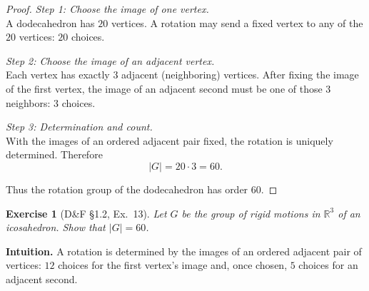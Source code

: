 \documentclass[12pt]{article}
\newtheorem{exercise}[theorem]{Exercise}
\theoremstyle{definition}
\begin{document}
\begin{proof}
\noindent\emph{Step 1: Choose the image of one vertex.}\\

\noindent
A dodecahedron has $20$ vertices. A rotation may send a fixed vertex to any of the $20$ vertices: $20$ choices.

\dotfill

\noindent\emph{Step 2: Choose the image of an adjacent vertex.}\\

\noindent
Each vertex has exactly $3$ adjacent (neighboring) vertices. After fixing the image of the first vertex, the image
of an adjacent second must be one of those $3$ neighbors: $3$ choices.

\dotfill

\noindent\emph{Step 3: Determination and count.}\\

\noindent
With the images of an ordered adjacent pair fixed, the rotation is uniquely determined. Therefore
\[
\lvert G\rvert=20\cdot 3=60.
\]

\dotfill

Thus the rotation group of the dodecahedron has order $60$.
\end{proof}

\newpage

\begin{exercise}[D\&F §1.2, Ex.~13]
Let $G$ be the group of rigid motions in $\mathbb{R}^3$ of an icosahedron. Show that $\lvert G\rvert=60$.
\end{exercise}

\dotfill

\noindent
\textbf{Intuition.}
A rotation is determined by the images of an ordered adjacent pair of vertices:
$12$ choices for the first vertex’s image and, once chosen, $5$ choices for an adjacent second.

\dotfill
\end{document}
